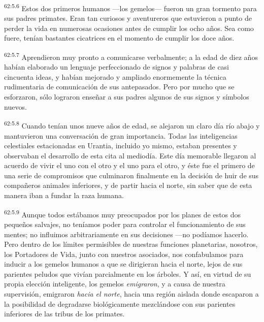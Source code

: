 \par
\textsuperscript{62:5.6} Estos dos primeros humanos ---los gemelos--- fueron un gran tormento para sus padres primates. Eran tan curiosos y aventureros que estuvieron a punto de perder la vida en numerosas ocasiones antes de cumplir los ocho años. Sea como fuere, tenían bastantes cicatrices en el momento de cumplir los doce años.

\par
\textsuperscript{62:5.7} Aprendieron muy pronto a comunicarse verbalmente; a la edad de diez años habían elaborado un lenguaje perfeccionado de signos y palabras de casi cincuenta ideas, y habían mejorado y ampliado enormemente la técnica rudimentaria de comunicación de sus antepasados. Pero por mucho que se esforzaron, sólo lograron enseñar a sus padres algunos de sus signos y símbolos nuevos.

\par
\textsuperscript{62:5.8} Cuando tenían unos nueve años de edad, se alejaron un claro día río abajo y mantuvieron una conversación de gran importancia. Todas las inteligencias celestiales estacionadas en Urantia, incluido yo mismo, estaban presentes y observaban el desarrollo de esta cita al mediodía. Este día memorable llegaron al acuerdo de vivir el uno con el otro y el uno para el otro, y éste fue el primero de una serie de compromisos que culminaron finalmente en la decisión de huir de sus compañeros animales inferiores, y de partir hacia el norte, sin saber que de esta manera iban a fundar la raza humana.

\par
\textsuperscript{62:5.9} Aunque todos estábamos muy preocupados por los planes de estos dos pequeños salvajes, no teníamos poder para controlar el funcionamiento de sus mentes; no influimos arbitrariamente en sus decisiones ---no podíamos hacerlo. Pero dentro de los límites permisibles de nuestras funciones planetarias, nosotros, los Portadores de Vida, junto con nuestros asociados, nos confabulamos para inducir a los gemelos humanos a que se dirigieran hacia el norte, lejos de sus parientes peludos que vivían parcialmente en los árboles. Y así, en virtud de su propia elección inteligente, los gemelos \textit{emigraron}, y a causa de nuestra supervisión, emigraron \textit{hacia el norte}, hacia una región aislada donde escaparon a la posibilidad de degradarse biológicamente mezclándose con sus parientes inferiores de las tribus de los primates.


